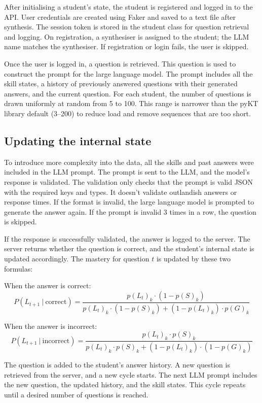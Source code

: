 After initialising a student's state, the student is registered and logged in to the API\@. User credentials are created using Faker and saved to a text file after synthesis. The session token is stored in the student class for question retrieval and logging. On registration, a synthesiser is assigned to the student; the LLM name matches the synthesiser. If registration or login fails, the user is skipped.

Once the user is logged in, a question is retrieved. This question is used to construct the prompt for the large language model. The prompt includes all the skill states, a history of previously answered questions with their generated answers, and the current question. For each student, the number of questions is drawn uniformly at random from 5 to 100. This range is narrower than the pyKT library default (3--200) to reduce load and remove sequences that are too short.

\subsection{Updating the internal state}

To introduce more complexity into the data, all the skills and past answers were included in the LLM prompt. The prompt is sent to the LLM, and the model's response is validated. The validation only checks that the prompt is valid JSON with the required keys and types. It doesn't validate outlandish answers or response times. If the format is invalid, the large language model is prompted to generate the answer again. If the prompt is invalid 3 times in a row, the question is skipped.

If the response is successfully validated, the answer is logged to the server. The server returns whether the question is correct, and the student's internal state is updated accordingly. The mastery for question $t$ is updated by these two formulas:

When the answer is correct:
\[ P(L_{t+1}\ |\ \text{correct}) = \frac{{p(L_t)}_k \cdot (1 - {p(S)}_k)}{{p(L_t)}_k \cdot (1-{p(S)}_k) + (1-{p(L_t)}_k) \cdot {p(G)}_k} \]

When the answer is incorrect:
\[ P(L_{t+1}\ |\ \text{incorrect}) = \frac{{p(L_t)}_k \cdot {p(S)}_k}{{p(L_t)}_k \cdot {p(S)}_k + (1-{p(L_t)}_k) \cdot (1-{p(G)}_k)} \]

The question is added to the student's answer history. A new question is retrieved from the server, and a new cycle starts. The next LLM prompt includes the new question, the updated history, and the skill states. This cycle repeats until a desired number of questions is reached.

